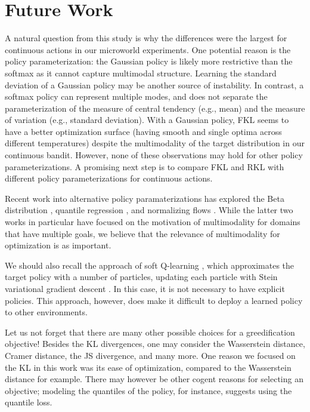 \documentclass[\main/thesis.tex]{subfiles}
\begin{document}
\section{Future Work}

A natural question from this study is why the differences were the largest for continuous actions in our microworld experiments. One potential reason is the policy parameterization: the Gaussian policy is likely more restrictive than the softmax as it cannot capture multimodal structure. Learning the standard deviation of a Gaussian policy may be another source of instability. In contrast, a softmax policy can represent multiple modes, and does not separate the parameterization of the measure of central tendency (e.g., mean) and the measure of variation (e.g., standard deviation). 
With a Gaussian policy, FKL seems to have a better optimization surface (having smooth and single optima across different temperatures) despite the multimodality of the target distribution in our continuous bandit. However, none of these observations may hold for other policy parameterizations. A promising next step is to compare FKL and RKL with different policy parameterizations for continuous actions.  

Recent work into alternative policy paramaterizations has explored the Beta distribution \citep{chou2017improving}, quantile regression \citep{richter2019learning}, and normalizing flows \citep{ward2019improving}. While the latter two works in particular have focused on the motivation of multimodality for domains that have multiple goals, we believe that the relevance of multimodality for optimization is as important. 

We should also recall the approach of soft Q-learning \citep{haarnoja2017reinforcement}, which approximates the target policy with a number of particles, updating each particle with Stein variational gradient descent \citep{liu2016stein,liu2017stein}. In this case, it is not necessary to have explicit policies. This approach, however, does make it difficult to deploy a learned policy to other environments. 

Let us not forget that there are many other possible choices for a greedification objective! Besides the KL divergences, one may consider the Wasserstein distance, Cramer distance, the JS divergence, and many more. One reason we focused on the KL in this work was its ease of optimization, compared to the Wasserstein distance for example. There may however be other cogent reasons for selecting an objective; modeling the quantiles of the policy, for instance, suggests using the quantile loss. 
\end{document}
